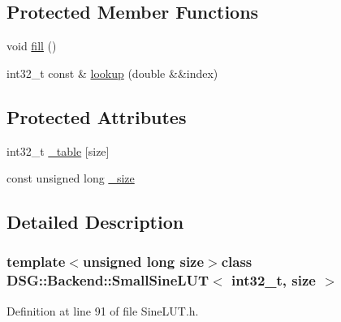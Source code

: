 \subsection*{Protected Member Functions}
\begin{DoxyCompactItemize}
\item 
void \hyperlink{classDSG_1_1Backend_1_1SmallSineLUT_3_01int32__t_00_01size_01_4_a88c1a17c38d0f8767bfdc899a22f7eba}{fill} ()
\item 
int32\+\_\+t const \& \hyperlink{classDSG_1_1Backend_1_1SmallSineLUT_3_01int32__t_00_01size_01_4_a9635d6cb5dd66d17c61ce09b3e437217}{lookup} (double \&\&index)
\end{DoxyCompactItemize}
\subsection*{Protected Attributes}
\begin{DoxyCompactItemize}
\item 
int32\+\_\+t \hyperlink{classDSG_1_1Backend_1_1DSG_1_1Backend_1_1LUT_a427da4b7eccdfe25e3c1889a8c2fdea6}{\+\_\+table} \mbox{[}size\mbox{]}
\item 
const unsigned long \hyperlink{classDSG_1_1Backend_1_1DSG_1_1Backend_1_1LUT_aa48956aa4debf08fdb517cb751d3e01d}{\+\_\+size}
\end{DoxyCompactItemize}


\subsection{Detailed Description}
\subsubsection*{template$<$unsigned long size$>$class D\+S\+G\+::\+Backend\+::\+Small\+Sine\+L\+U\+T$<$ int32\+\_\+t, size $>$}



Definition at line 91 of file Sine\+L\+U\+T.\+h.



